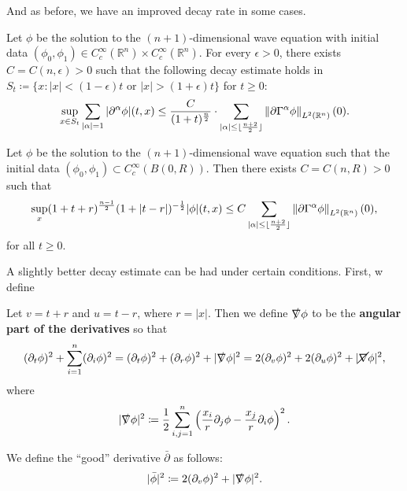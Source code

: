 \documentclass{article}
\begin{document}
And as before, we have an improved decay rate in some cases. 
\begin{lemma}
	Let $\phi$ be the solution to the $(n + 1)$-dimensional wave equation with initial data $(\phi_{0}, \phi_{1}) \in C_{c}^{\infty}(\mathbb{R}^{n}) \times C_{c}^{\infty}(\mathbb{R}^{n})$. For every $\epsilon > 0$, there exists $C = C(n, \epsilon) > 0$ such that the following decay estimate holds in $S_{t} \coloneqq \{x: |x| < (1 - \epsilon)t \text{ or } |x| > (1 + \epsilon)t\}$ for $t \geq 0$: 
	\begin{equation*}
		\sup_{x \in S_{t}}\sum_{|\alpha| = 1}|\partial^{\alpha}\phi|(t, x) \leq \frac{C}{(1 + t)^{\frac{n}{2}}} \cdot \sum_{|\alpha|\leq \lfloor \frac{n + 2}{2} \rfloor}\left\Vert \partial\Gamma^{\alpha}\phi \right\Vert_{L^{2}(\mathbb{R}^{n})}(0). 
	\end{equation*} 
\end{lemma} 
\begin{corollary}
	Let $\phi$ be the solution to the $(n + 1)$-dimensional wave equation such that the initial data $(\phi_{0}, \phi_{1}) \subset C_{c}^{\infty}(B(0,R))$. Then there exists $C = C(n,R) > 0$ such that 
	\begin{equation*}
		\sup_{x}(1 + t + r)^{\frac{n- 1}{2}}(1 + |t - r|)^{-\frac{1}{2}}|\phi|(t,x) \leq C \sum_{|\alpha| \leq \lfloor \frac{n + 2}{2}\rfloor}\left\Vert \partial \Gamma^{\alpha}\phi \right\Vert_{L^{2}(\mathbb{R}^{n})}(0),
	\end{equation*}
	for all $t \geq 0$. 
\end{corollary}
A slightly better decay estimate can be had under certain conditions. First, w define 
\begin{definition}
	Let $v = t + r$ and $u = t - r$, where $r = |x|$. Then we define $\slashed\nabla \phi$ to be the \textbf{angular part of the derivatives} so that 
	\begin{equation*}
		(\partial_{t}\phi)^{2} + \sum_{i = 1}^{n}(\partial_{i}\phi)^{2} = (\partial_{t}\phi)^{2} + (\partial_{r}\phi)^{2} + |\slashed\nabla \phi|^{2} = 2(\partial_{v}\phi)^{2} + 2(\partial_{u}\phi)^{2} + |\cancel \nabla \phi|^{2}, 
	\end{equation*} 
	where 
	\begin{equation*}
		|\slashed\nabla \phi|^{2} \coloneqq \frac{1}{2}\sum_{i,j = 1}^{n}\left(\frac{x_{i}}{r}\partial_{j}\phi - \frac{x_{j}}{r}\partial_{i}\phi\right)^{2}. 
	\end{equation*} 
\end{definition}  
\begin{definition}
	We define the ``good'' derivative $\bar{\partial}$ as follows: 
	\begin{equation*}
		|\bar{\phi}|^{2} \coloneqq 2(\partial_{v}\phi)^{2} + |\slashed\nabla \phi|^{2}. 
	\end{equation*} 
\end{definition} 
\end{document}
